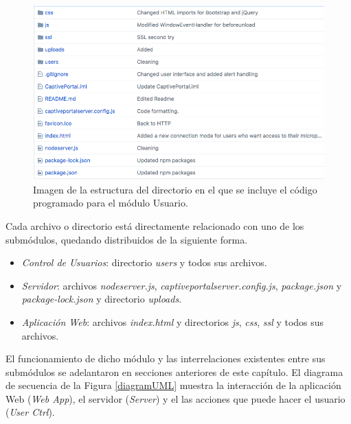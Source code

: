 \begin{figure}[!t]
\begin{center}
\includegraphics[width=0.75\linewidth]{./5_AnalisisOrganico/Img/repoGitHub.png}
\end{center}
\caption{Imagen de la estructura del directorio en el que se incluye el código programado para el módulo Usuario.}
\label{repoGitHub}
\end{figure}

Cada archivo o directorio está directamente relacionado con uno de los submódulos, quedando distribuidos de la siguiente forma.

\begin{itemize}
\item \emph{Control de Usuarios}: directorio \emph{users} y todos sus archivos.
\item \emph{Servidor}: archivos \emph{nodeserver.js}, \emph{captiveportalserver.config.js}, \emph{package.json} y \emph{package-lock.json} y directorio \emph{uploads}.
\item \emph{Aplicación Web}: archivos \emph{index.html} y directorios \emph{js}, \emph{css}, \emph{ssl} y todos sus archivos.
\end{itemize}

El funcionamiento de dicho módulo y las interrelaciones existentes entre sus submódulos se adelantaron en secciones anteriores de este capítulo. El diagrama de secuencia de la Figura \ref{diagramUML} muestra la interacción de la aplicación Web (\emph{Web App}), el servidor (\emph{Server}) y el las acciones que puede hacer el usuario (\emph{User Ctrl}).


